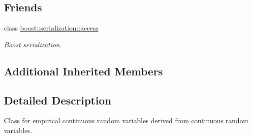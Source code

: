 \subsection*{Friends}
\begin{DoxyCompactItemize}
\item 
class \hyperlink{class_c_empirical_c_r_v_ac98d07dd8f7b70e16ccb9a01abf56b9c}{boost\-::serialization\-::access}
\begin{DoxyCompactList}\small\item\em Boost serialization. \end{DoxyCompactList}\end{DoxyCompactItemize}
\subsection*{Additional Inherited Members}


\subsection{Detailed Description}
Class for empirical continuous random variables derived from continuous random variables. 

